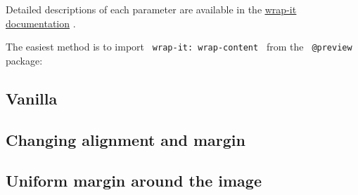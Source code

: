 Detailed descriptions of each parameter are available in the
\ul{\ul{\href{https://github.com/ntjess/wrap-it/blob/main/docs/manual.pdf}{wrap-it
documentation}}} .

The easiest method is to import \texttt{\ wrap-it:\ wrap-content\ } from
the \texttt{\ @preview\ } package:

\begin{Shaded}
\begin{Highlighting}[]
\end{Highlighting}
\end{Shaded}

\subsection{Vanilla}\label{vanilla}

\begin{Shaded}
\begin{Highlighting}[]
\NormalTok{)}
\end{Highlighting}
\end{Shaded}


\subsection{Changing alignment and
margin}\label{changing-alignment-and-margin}

\begin{Shaded}
\begin{Highlighting}[]
\NormalTok{)}
\end{Highlighting}
\end{Shaded}


\subsection{Uniform margin around the
image}\label{uniform-margin-around-the-image}

